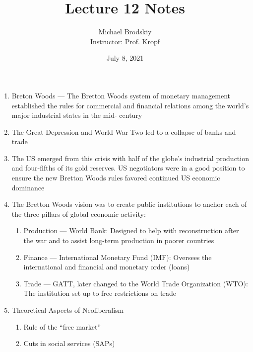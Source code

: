 \documentclass[12pt]{article}
\title{Lecture 12 Notes}
\date{July 8, 2021}
\author{Michael Brodskiy\\ \small Instructor: Prof. Kropf}
\begin{document}
    \maketitle

    \begin{enumerate}

      \item Breton Woods — The Bretton Woods system of monetary management established the rules for commercial and financial relations among the world's major industrial states in the mid- century

      \item The Great Depression and World War Two led to a collapse of banks and trade

      \item The US emerged from this crisis with half of the globe’s industrial production and four-fifths of its gold reserves. US negotiators were in a good position to ensure the new Bretton Woods rules favored continued US economic dominance

      \item The Bretton Woods vision was to create public institutions to anchor each of the three pillars of global economic activity: 

        \begin{enumerate}

          \item Production — World Bank: Designed to help with reconstruction after the war and to assist long-term production in poorer countries

          \item Finance — International Monetary Fund (IMF): Oversees the international and financial and monetary order (loans)

          \item Trade — GATT, later changed to the World Trade Organization (WTO): The institution set up to free restrictions on trade

        \end{enumerate}

      \item Theoretical Aspects of Neoliberalism

        \begin{enumerate}

          \item Rule of the “free market”

          \item Cuts in social services (SAPs)


\end{enumerate}
\end{enumerate}
\end{document}
